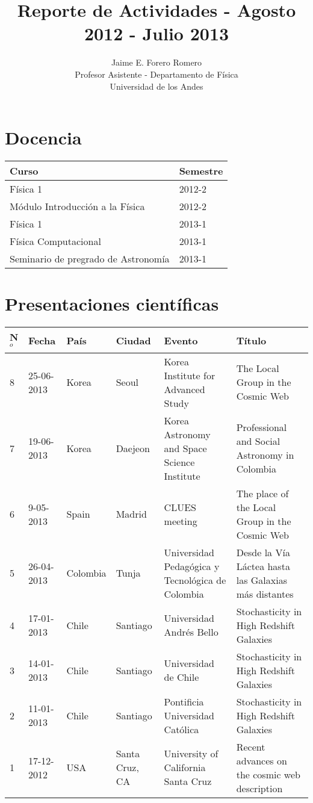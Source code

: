 \documentclass{article}
\title{Reporte de Actividades - Agosto 2012 - Julio 2013}
\author{Jaime E. Forero Romero\\Profesor Asistente - Departamento de
  F\'isica\\Universidad de los Andes}
\begin{document}
\section*{Docencia}

\begin{tabular}{p{7.0cm} p{1.5cm}}\hline
Curso & Semestre\\\hline
F\'isica 1 & 2012-2 \\
M\'odulo Introducci\'on a la F\'isica & 2012-2 \\
F\'isica 1 & 2013-1\\
F\'isica Computacional & 2013-1\\
Seminario de pregrado de Astronom\'ia & 2013-1\\\hline
\end{tabular}

\section*{Presentaciones cient\'ificas}

\begin{tabular}{lp{2.0cm} p{1.2cm} p{1.5cm} p{2cm} p{5cm}}\hline
N$^{o}$ & Fecha & Pa\'is & Ciudad & Evento & T\'itulo \\\hline
8 & 25-06-2013 & Korea & Seoul & Korea Institute for Advanced Study &
The Local Group in the Cosmic Web\\ 
7 & 19-06-2013 & Korea & Daejeon & Korea Astronomy and Space Science
Institute & Professional and Social Astronomy in Colombia\\ 
6 & 9-05-2013 & Spain & Madrid & CLUES meeting & The place of the
Local Group in the Cosmic Web\\ 
5 & 26-04-2013 & Colombia & Tunja & Universidad Pedag\'ogica y
Tecnol\'ogica de Colombia & Desde la V\'ia L\'actea hasta las Galaxias
m\'as distantes\\ 
4 &17-01-2013 & Chile & Santiago  & Universidad Andr\'es Bello &
Stochasticity in High Redshift Galaxies\\ 
3 &14-01-2013 & Chile & Santiago  & Universidad de Chile&
Stochasticity in High Redshift Galaxies\\
2 & 11-01-2013 & Chile & Santiago  & Pontificia Universidad Cat\'olica&
Stochasticity in High Redshift Galaxies\\
1 & 17-12-2012 & USA & Santa Cruz, CA & University of California Santa
Cruz & Recent advances on the cosmic web description\\  \hline
\end{tabular}
\end{document}
